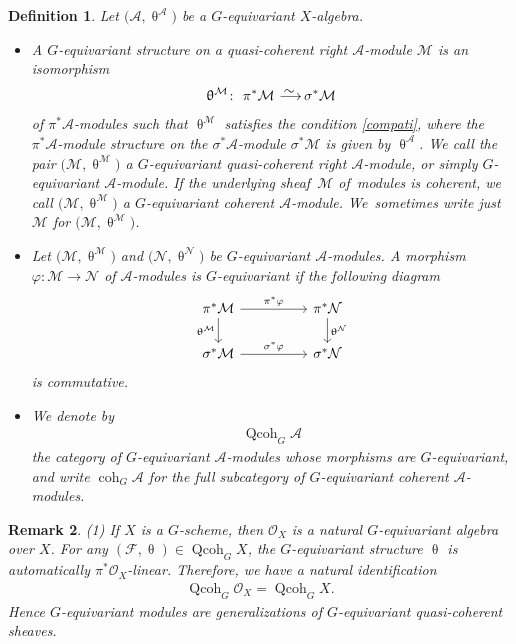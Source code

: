 \documentclass[pdftex]{sigma}%
\newtheorem{dfn}{Definition}[section]
\newtheorem{rem}[dfn]{Remark}
\numberwithin{equation}{section}
\newcommand{\coh}{\operatorname{coh}}
\newcommand{\Qcoh}{\operatorname{Qcoh}}
\newcommand{\cA}{\mathcal{A}}
\newcommand{\cF}{\mathcal{F}}
\newcommand{\cM}{\mathcal{M}}
\newcommand{\cN}{\mathcal{N}}
\newcommand{\cO}{\mathcal{O}}
\newcommand{\simto}{\,\,\,\,\raisebox{4pt}{$\sim$}{\kern -1.1em \longrightarrow}\,}
\begin{document}
\begin{dfn}\label{equiv sheaf}
Let $\big(\cA,\uptheta^{\cA}\big)$ be a $G$-equivariant $X$-algebra.
\begin{itemize}\itemsep=0pt
\item[1.] A {\it $G$-equivariant structure} on a quasi-coherent right $\cA$-module $\cM$ is an isomorphism
\begin{gather*}
\uptheta^{\cM}\colon\ \pi^*\cM\simto \sigma^*\cM
\end{gather*}
of $\pi^*\cA$-modules such that $\uptheta^{\cM}$ satisfies the condition \eqref{compati}, where the $\pi^*\cA$-module structure on the $\sigma^*\cA$-module $\sigma^*\cM$ is given by $\uptheta^{\cA}$.
We call the pair $\big(\cM,\uptheta^{\cM}\big)$ a {\it $G$-equivariant quasi-coherent right $\cA$-module}, or simply {\it $G$-equivariant $\cA$-module}. If the underlying sheaf~$\cM$ of~modu\-les is coherent, we call $\big(\cM,\uptheta^{\cM}\big)$ a {\it $G$-equivariant coherent $\cA$-module}. We~sometimes write just $\cM$ for $\big(\cM,\uptheta^{\cM}\big)$.


\item[2.] Let $\big(\cM,\uptheta^{\cM}\big)$ and $\big(\cN,\uptheta^{\cN}\big)$ be $G$-equivariant $\cA$-modules. A morphism $\varphi\colon \cM\to \cN$ of $\cA$-modules is {\it $G$-equivariant} if the following diagram
\[
\begin{tikzcd}
\pi^*\cM\arrow[rr,"\pi^*\varphi"]\arrow[d,"\uptheta^{\cM}"']&&\pi^*\cN\arrow[d," \uptheta^{\cN}"]\\
\sigma^*\cM\arrow[rr, "\sigma^*\varphi"]&&\sigma^*\cN
\end{tikzcd}
\]
is commutative.

\item[3.] We denote by
\begin{gather*}\Qcoh_G\cA\end{gather*} the category of $G$-equivariant $\cA$-modules whose morphisms are $G$-equivariant, and write $\coh_G\cA$ for the full subcategory of $G$-equivariant coherent $\cA$-modules.
\end{itemize}
\end{dfn}

\begin{rem}
(1) If $X$ is a $G$-scheme, then $\cO_X$ is a natural $G$-equivariant algebra over $X$. For any $(\cF,\uptheta)\in \Qcoh_GX$, the $G$-equivariant structure $\uptheta$ is automatically $\pi^*\cO_X$-linear. Therefore, we have a natural identification
\begin{gather*}
\Qcoh_G\cO_X=\Qcoh_GX.
\end{gather*}
Hence $G$-equivariant modules are generalizations of $G$-equivariant quasi-coherent sheaves.
\end{rem}
\end{document}
